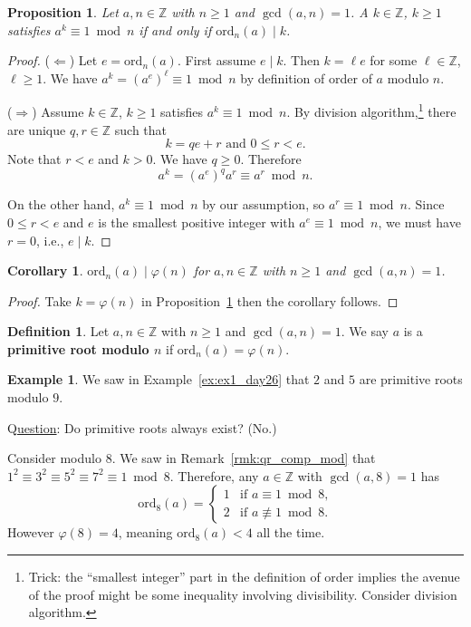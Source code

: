\documentclass{amsbook}
\theoremstyle{plain}
\newtheorem{corollary}[theorem]{Corollary}
\newtheorem{proposition}[theorem]{Proposition}
\theoremstyle{definition}
\newtheorem{definition}[theorem]{Definition}
\newtheorem{example}[theorem]{Example}
\theoremstyle{remark}
\numberwithin{equation}{chapter}
\numberwithin{figure}{chapter}
\newcommand{\Z}{\mathbb{Z}}
\newcommand*{\ord}{\text{ord}}
\begin{document}
\begin{proposition}\label{prop:ord_div_k}
  Let $a, n \in \Z$ with $n \geqslant 1$ and $\gcd (a, n) = 1$. A $k \in \Z$, $k \geqslant 1$ satisfies $a^k \equiv 1 \bmod n$ if and only if $\ord_n (a) \mid k$.
\end{proposition}
\begin{proof}
  ($\Leftarrow$) Let $e = \ord_n (a)$. First assume $e \mid k$. Then $k = \ell e$ for some $\ell \in \Z$, $\ell \geqslant 1$. We have $a^k = (a^e)^{\ell} \equiv 1 \bmod n$ by definition of order of $a$ modulo $n$.

($\Rightarrow$) Assume $k \in \Z$, $k \geqslant 1$ satisfies $a^k \equiv 1 \bmod n$. By division algorithm,\footnote{Trick: the ``smallest integer'' part in the definition of order implies the avenue of the proof might be some inequality involving divisibility. Consider division algorithm.} there are unique $q, r \in \Z$ such that 
\[
k = qe + r \text{ and } 0 \leqslant r < e.
\]
Note that $r < e$ and $k > 0$. We have $q \geqslant 0$. Therefore 
\[
a^k = (a^e)^q a^r \equiv a^r \bmod n.
\]

On the other hand, $a^k \equiv 1 \bmod n$ by our assumption, so $a^r \equiv 1 \bmod n$. Since $0 \leqslant r < e$ and $e$ is the smallest positive integer with $a^e \equiv 1 \bmod n$, we must have $r = 0$, i.e., $e \mid k$.
\end{proof}

\begin{corollary}\label{cor:ord_div_phi}
$\ord_n (a) \mid \varphi (n)$ for $a, n \in \Z$ with $n \geqslant 1$ and $\gcd (a, n) = 1$.
\end{corollary}
\begin{proof}
  Take $k = \varphi (n)$ in Proposition~\ref{prop:ord_div_k} then the corollary follows.
\end{proof}

\begin{definition}\label{def:prim_rt}
  Let $a, n \in \Z$ with $n \geqslant 1$ and $\gcd (a, n) = 1$. We say $a$ is a \textbf{primitive root modulo $n$} if $\ord_n (a) = \varphi (n)$.
\end{definition}

\begin{example}
  We saw in Example~\ref{ex:ex1_day26} that $2$ and $5$ are primitive roots modulo $9$.
\end{example}

Q\underline{uestion}: Do primitive roots always exist? (No.)

Consider modulo $8$. We saw in Remark~\ref{rmk:qr_comp_mod} that $1^2 \equiv 3^2 \equiv 5^2 \equiv 7^2 \equiv 1 \bmod 8$. Therefore, any $a \in \Z$ with $\gcd (a, 8) = 1$ has 
\[
\ord_8 (a) = \left\{ \begin{array}{rl} 
                       1 & \text{if $a \equiv 1 \bmod 8$,} \\[1mm]
                       2 & \text{if $a \not\equiv 1 \bmod 8$.}
                     \end{array} \right.
\]
However $\varphi (8) = 4$, meaning $\ord_8(a) < 4$ all the time.\\[-1.5mm]
\end{document}
